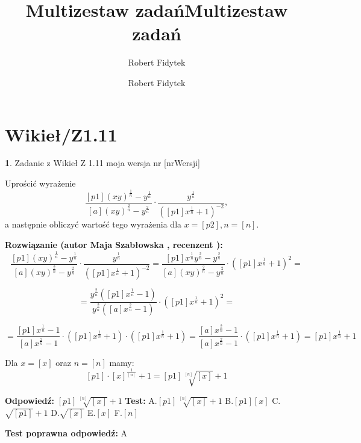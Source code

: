 \documentclass[12pt, a4paper]{article}
\title{Multizestaw zadań}
\author{Robert Fidytek}
\date{}\documentclass[12pt, a4paper]{article}
\title{Multizestaw zadań}
\author{Robert Fidytek}
\date{}
\theoremstyle{definition} %
\newtheorem{zad}{}
\theoremstyle{definition} %
\newtheorem{zad}{}
\newcommand{\kategoria}[1]{\section{#1}} %
\newcommand{\zadStart}[1]{\begin{zad}#1\newline} %
\newcommand{\zadStop}{\end{zad}}   %
\newcommand{\rozwStart}[2]{\noindent \textbf{Rozwiązanie (autor #1 , recenzent #2): }\newline} %
\newcommand{\rozwStop}{\newline}                                            %
\newcommand{\odpStart}{\noindent \textbf{Odpowiedź:}\newline}    %
\newcommand{\odpStop}{\newline}                                             %
\newcommand{\testStart}{\noindent \textbf{Test:}\newline} %
\newcommand{\testStop}{\newline} %
\newcommand{\kluczStart}{\noindent \textbf{Test poprawna odpowiedź:}\newline} %
\newcommand{\kluczStop}{\newline} %
\begin{document}
\maketitle


\kategoria{Wikieł/Z1.11}
\zadStart{Zadanie z Wikieł Z 1.11 moja wersja nr [nrWersji]}



Uprościć wyrażenie $$\frac{[p1](xy)^{\frac{1}{n}}-y^{\frac{1}{n}}}{[a](xy)^{\frac{2}{n}}-y^{\frac{2}{n}}}\cdot \frac{y^{\frac{1}{n}}}{\left([p1]x^{\frac{1}{n}}+1\right)^{-2}},$$
a następnie obliczyć wartość tego wyrażenia dla $x=[p2], n=[n].$
\zadStop

\rozwStart{Maja Szabłowska}{}
$$\frac{[p1](xy)^{\frac{1}{n}}-y^{\frac{1}{n}}}{[a](xy)^{\frac{2}{n}}-y^{\frac{2}{n}}}\cdot \frac{y^{\frac{1}{n}}}{\left([p1]x^{\frac{1}{n}}+1\right)^{-2}}=\frac{[p1]x^{\frac{1}{n}}y^{\frac{2}{n}}-y^{\frac{2}{n}}}{[a](xy)^{\frac{2}{n}}-y^{\frac{2}{n}}}\cdot\left([p1]x^{\frac{1}{n}}+1\right)^{2}=$$

$$=\frac{y^{\frac{2}{n}}([p1]x^{\frac{1}{n}}-1)}{y^{\frac{2}{n}}([a]x^{\frac{2}{n}}-1)}\cdot \left([p1]x^{\frac{1}{n}}+1\right)^{2}=$$

$$=\frac{[p1]x^{\frac{1}{n}}-1}{[a]x^{\frac{2}{n}}-1}\cdot \left([p1]x^{\frac{1}{n}}+1\right) \cdot \left([p1]x^{\frac{1}{n}}+1\right)= \frac{[a]x^{\frac{2}{n}}-1}{[a]x^{\frac{2}{n}}-1}\cdot\left([p1]x^{\frac{1}{n}}+1\right)=[p1]x^{\frac{1}{n}}+1$$

Dla $x=[x]$ oraz $n=[n]$ mamy:
$$[p1]\cdot[x]^{\frac{1}{[n]}}+1=[p1]\sqrt[[n]]{[x]}+1$$


\rozwStop


\odpStart
$[p1]\sqrt[[n]]{[x]}+1$
\odpStop
\testStart
A.$[p1]\sqrt[[n]]{[x]}+1$
B.$[p1][x]$
C.$\sqrt{[p1]}+1$
D.$\sqrt{[x]}$
E.$[x]$
F.$[n]$


\testStop
\kluczStart
A
\kluczStop
\end{document}

